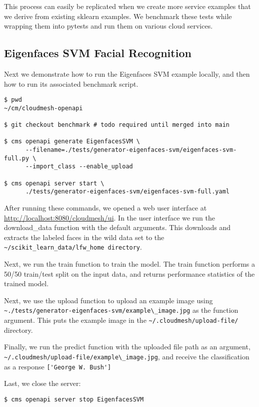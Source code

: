 This process can easily be replicated when we create more service
examples that we derive from existing sklearn examples. We benchmark
these tests while wrapping them into pytests and run them on various
cloud services.

\subsection{Eigenfaces SVM Facial
Recognition}\label{a.3.-eigenfaces-svm-facial-recognition}

Next we demonstrate how to run the Eigenfaces SVM example locally, and
then how to run its associated benchmark script.

\begin{verbatim}
$ pwd
~/cm/cloudmesh-openapi

$ git checkout benchmark # todo required until merged into main

$ cms openapi generate EigenfacesSVM \
      --filename=./tests/generator-eigenfaces-svm/eigenfaces-svm-full.py \
      --import_class --enable_upload

$ cms openapi server start \
      ./tests/generator-eigenfaces-svm/eigenfaces-svm-full.yaml
\end{verbatim}

After running these commands, we opened a web user interface at
\url{http://localhost:8080/cloudmesh/ui}. In the user interface we run
the download\_data function with the default arguments. This downloads
and extracts the labeled faces in the wild data set to the
\verb|~/scikit_learn_data/lfw_home directory|.

Next, we run the train function to train the model. The train function
performs a 50/50 train/test split on the input data, and returns
performance statistics of the trained model.

Next, we use the upload function to upload an example image using
\verb|~./tests/generator-eigenfaces-svm/example\_image.jpg|
as the function argument. This puts the example image in the
\verb|~/.cloudmesh/upload-file/| directory.

Finally, we run the predict function with the uploaded file path as an
argument,
\verb|~/.cloudmesh/upload-file/example\_image.jpg|,
and receive the classification as a response
\verb|['George W. Bush']|

Last, we close the server:

\begin{verbatim}
$ cms openapi server stop EigenfacesSVM
\end{verbatim}


